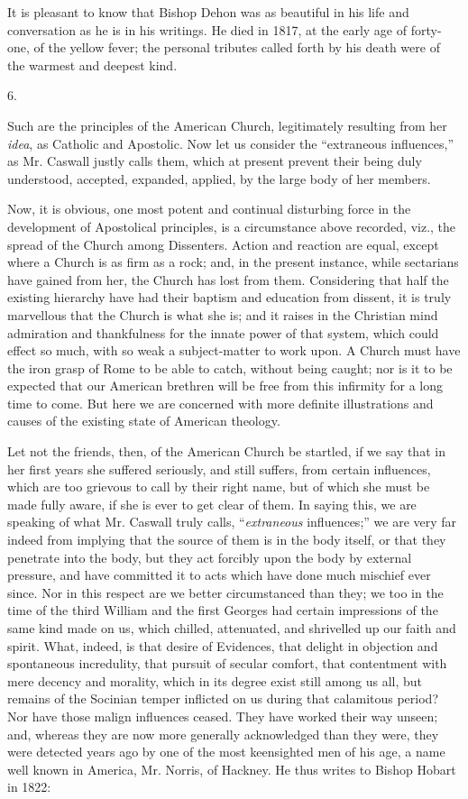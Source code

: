 It is pleasant to know that Bishop Dehon was as
beautiful in his life and conversation as he is in his writings.
He died in 1817, at the early age of forty-one, of the yellow fever;
the personal tributes called forth by his death were of the warmest
and deepest kind.

6.

Such are the principles of the American Church,
legitimately resulting from her \emph{idea}, as Catholic and
Apostolic. Now let us consider the ``extraneous influences,'' as Mr.
Caswall justly calls them, which at present prevent their being duly
understood, accepted, expanded, applied, by the large body of her
members.

Now, it is obvious, one most potent and continual
disturbing force in the development of Apostolical principles, is a
circumstance above recorded, viz., the spread of the Church among
Dissenters. Action and reaction are equal, except where a Church is as
firm as a rock; and, in the present instance, while sectarians have
gained from her, the Church has lost from them. Considering that half
the existing hierarchy have had their baptism and education from
dissent, it is truly marvellous that the Church is what she is; and it
raises in the Christian mind admiration and thankfulness for the
innate power of that system, which could effect so much, with so weak
a subject-matter to work upon. A Church must have the iron grasp of
Rome to be able to catch, without being caught; nor is it to be
expected that our American brethren will be free from this infirmity
for a long time to come. But here we are concerned with more definite
illustrations and causes of the existing state of American theology.

Let not the friends, then, of the American Church
be startled, if we say that in her first years she suffered seriously,
and still suffers, from certain influences, which are too
grievous to call by their right name, but of which she must be made
fully aware, if she is ever to get clear of them. In saying this, we
are speaking of what Mr. Caswall truly calls, ``\emph{extraneous}
influences;'' we are very far indeed from implying that the source of
them is in the body itself, or that they penetrate into the body, but
they act forcibly upon the body by external pressure, and have
committed it to acts which have done much mischief ever since. Nor in
this respect are we better circumstanced than they; we too in the time
of the third William and the first Georges had certain impressions of
the same kind made on us, which chilled, attenuated, and shrivelled up
our faith and spirit. What, indeed, is that desire of Evidences, that
delight in objection and spontaneous incredulity, that pursuit of
secular comfort, that contentment with mere decency and morality,
which in its degree exist still among us all, but remains of the
Socinian temper inflicted on us during that calamitous period? Nor
have those malign influences ceased. They have worked their way
unseen; and, whereas they are now more generally acknowledged than
they were, they were detected years ago by one of the most keensighted
men of his age, a name well known in America, Mr. Norris, of Hackney.
He thus writes to Bishop Hobart in 1822:

